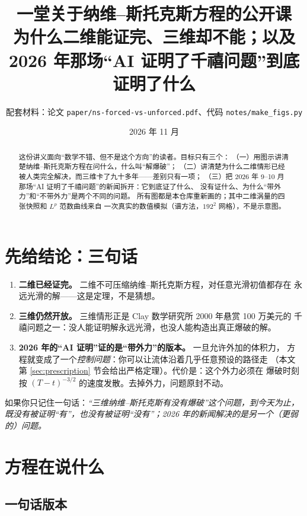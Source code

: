 \documentclass[11pt,a4paper]{article}
\title{\bfseries 一堂关于纳维–斯托克斯方程的公开课\\[4pt]
\large 为什么二维能证完、三维却不能；以及 2026 年那场“AI 证明了千禧问题”到底证明了什么}
\author{配套材料：论文 \texttt{paper/ns-forced-vs-unforced.pdf}、代码 \texttt{notes/make\_figs.py}}
\date{2026 年 11 月}
\begin{document}
\maketitle

\begin{abstract}
\noindent
这份讲义面向“数学不错、但不是这个方向”的读者。目标只有三个：
（一）用图示讲清楚纳维–斯托克斯方程在问什么，什么叫“解爆破”；
（二）讲清楚为什么二维情形已经被人类完全解决，而三维卡了九十多年——差别只有一项；
（三）把 2026 年 9--10 月那场“AI 证明了千禧问题”的新闻拆开：它到底证了什么、
没有证什么、为什么“带外力”和“不带外力”是两个不同的问题。
所有图都是本仓库重新画的；其中二维涡量的四张快照和 $L^p$ 范数曲线来自
一次真实的数值模拟（谱方法，$192^2$ 网格），不是示意图。
\end{abstract}

\tableofcontents

\section{先给结论：三句话}

\begin{keybox}[本文的三句话]
\begin{enumerate}[leftmargin=1.6em]
\item \textbf{二维已经证完。} 二维不可压缩纳维–斯托克斯方程，对任意光滑初值都存在
      永远光滑的解——这是定理，不是猜想。
\item \textbf{三维仍然开放。} 三维情形正是 Clay 数学研究所 2000 年悬赏 100 万美元的
      千禧问题之一：没人能证明解永远光滑，也没人能构造出真正爆破的解。
\item \textbf{2026 年的“AI 证明”证的是“带外力”的版本。} 一旦允许外加的体积力，
      方程就变成了一个\emph{控制问题}：你可以让流体沿着几乎任意预设的路径走
      （本文第 \ref{sec:prescription} 节会给出严格定理）。代价是：这个外力必须在
      爆破时刻按 $(T-t)^{-3/2}$ 的速度发散。去掉外力，问题原封不动。
\end{enumerate}
\end{keybox}

如果你只记住一句话：\emph{“三维纳维–斯托克斯有没有爆破”这个问题，到今天为止，
既没有被证明“有”，也没有被证明“没有”；2026 年的新闻解决的是另一个（更弱的）问题。}

\section{方程在说什么}

\subsection{一句话版本}
\end{document}

